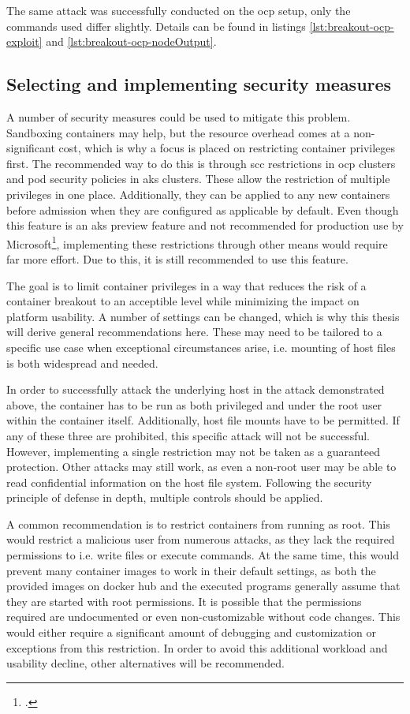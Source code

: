 The same attack was successfully conducted on the \gls{ocp} setup, only the commands used differ slightly. Details can be found in listings \ref{lst:breakout-ocp-exploit} and \ref{lst:breakout-ocp-nodeOutput}.

\subsection{Selecting and implementing security measures} \label{measures2}
A number of security measures could be used to mitigate this problem.
Sandboxing containers may help, but the resource overhead comes at a non-significant cost, which is why a focus is placed on restricting container privileges first.
The recommended way to do this is through \gls{scc} restrictions in \gls{ocp} clusters and pod security policies in \gls{aks} clusters. These allow the restriction of multiple privileges in one place. Additionally, they can be applied to any new containers before admission when they are configured as applicable by default.
Even though this feature is an \gls{aks} preview feature and not recommended for production use by Microsoft\footcite[][, second paragraph with the headline 'important']{aksPodSecPol}, implementing these restrictions through other means would require far more effort. Due to this, it is still recommended to use this feature.

The goal is to limit container privileges in a way that reduces the risk of a container breakout to an acceptible level while minimizing the impact on platform usability.
A number of settings can be changed, which is why this thesis will derive general recommendations here. These may need to be tailored to a specific use case when exceptional circumstances arise, i.e. mounting of host files is both widespread and needed.

In order to successfully attack the underlying host in the attack demonstrated above, the container has to be run as both privileged and under the root user within the container itself. Additionally, host file mounts have to be permitted. If any of these three are prohibited, this specific attack will not be successful. However, implementing a single restriction may not be taken as a guaranteed protection. Other attacks may still work, as even a non-root user may be able to read confidential information on the host file system. Following the security principle of defense in depth, multiple controls should be applied.

\newpage
A common recommendation is to restrict containers from running as root. This would restrict a malicious user from numerous attacks, as they lack the required permissions to i.e. write files or execute commands. At the same time, this would prevent many container images to work in their default settings, as both the provided images on docker hub and the executed programs generally assume that they are started with root permissions. It is possible that the permissions required are undocumented or even non-customizable without code changes. This would either require a significant amount of debugging and customization or exceptions from this restriction. In order to avoid this additional workload and usability decline, other alternatives will be recommended.

